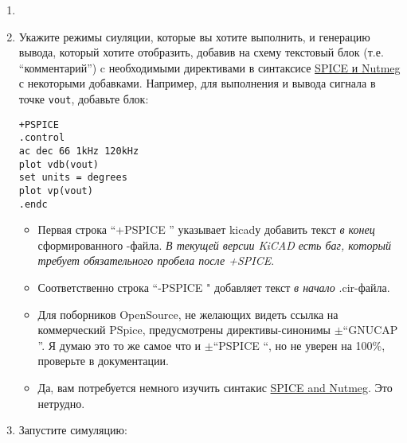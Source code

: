 \begin{enumerate}
  \item
  \item
Укажите режимы сиуляции, которые вы хотите выполнить, и генерацию вывода,
который хотите отобразить, добавив на схему текстовый блок (т.е.
``комментарий'') c необходимыми директивами в синтаксисе
\href{http://newton.ex.ac.uk/teaching/cdhw/Electronics2/userguide/sec5.html}{SPICE и Nutmeg}
с некоторыми добавками. Например, для выполнения  и вывода сигнала в точке \verb|vout|, добавьте блок:
\begin{lstlisting}
+PSPICE
.control
ac dec 66 1kHz 120kHz
plot vdb(vout)
set units = degrees
plot vp(vout)
.endc
\end{lstlisting}
\begin{itemize}
  \item
Первая строка ``+PSPICE '' указывает kicadу добавить текст \emph{в конец}
сформированного -файла. \emph{В текущей версии KiCAD есть баг,
который требует обязательного пробела после +SPICE}.
  \item
Соответственно строка ``-PSPICE " добавляет текст \emph{в начало} .cir-файла.
  \item
Для поборников OpenSource, не желающих видеть ссылка на коммерческий PSpice,
предусмотрены директивы-синонимы $\pm$``GNUCAP ''. Я думаю это то же самое что и
$\pm$``PSPICE ``, но не уверен на 100\%, проверьте в документации.
  \item
Да, вам потребуется немного изучить синтакис 
\href{http://newton.ex.ac.uk/teaching/cdhw/Electronics2/userguide/sec5.html}{SPICE
and Nutmeg}. Это нетрудно.
\end{itemize}
  \item
Запустите симуляцию:
\end{enumerate}

\secup
